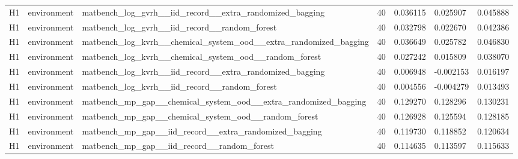 \documentclass[10pt]{article}
\begin{document}
\begin{landscape}
\begin{longtable}{L{.35in}L{.6in}L{3.55in}L{.4in}L{.88in}L{.88in}L{.88in}}
H1 & environment & matbench\_\allowbreak{}log\_\allowbreak{}gvrh\_\allowbreak{}\_\allowbreak{}iid\_\allowbreak{}record\_\allowbreak{}\_\allowbreak{}extra\_\allowbreak{}randomized\_\allowbreak{}bagging & 40 & 0.036115 & 0.025907 & 0.045888\\
H1 & environment & matbench\_\allowbreak{}log\_\allowbreak{}gvrh\_\allowbreak{}\_\allowbreak{}iid\_\allowbreak{}record\_\allowbreak{}\_\allowbreak{}random\_\allowbreak{}forest & 40 & 0.032798 & 0.022670 & 0.042386\\
H1 & environment & matbench\_\allowbreak{}log\_\allowbreak{}kvrh\_\allowbreak{}\_\allowbreak{}chemical\_\allowbreak{}system\_\allowbreak{}ood\_\allowbreak{}\_\allowbreak{}extra\_\allowbreak{}randomized\_\allowbreak{}bagging & 40 & 0.036649 & 0.025782 & 0.046830\\
H1 & environment & matbench\_\allowbreak{}log\_\allowbreak{}kvrh\_\allowbreak{}\_\allowbreak{}chemical\_\allowbreak{}system\_\allowbreak{}ood\_\allowbreak{}\_\allowbreak{}random\_\allowbreak{}forest & 40 & 0.027242 & 0.015809 & 0.038070\\
H1 & environment & matbench\_\allowbreak{}log\_\allowbreak{}kvrh\_\allowbreak{}\_\allowbreak{}iid\_\allowbreak{}record\_\allowbreak{}\_\allowbreak{}extra\_\allowbreak{}randomized\_\allowbreak{}bagging & 40 & 0.006948 & -0.002153 & 0.016197\\
H1 & environment & matbench\_\allowbreak{}log\_\allowbreak{}kvrh\_\allowbreak{}\_\allowbreak{}iid\_\allowbreak{}record\_\allowbreak{}\_\allowbreak{}random\_\allowbreak{}forest & 40 & 0.004556 & -0.004279 & 0.013493\\
H1 & environment & matbench\_\allowbreak{}mp\_\allowbreak{}gap\_\allowbreak{}\_\allowbreak{}chemical\_\allowbreak{}system\_\allowbreak{}ood\_\allowbreak{}\_\allowbreak{}extra\_\allowbreak{}randomized\_\allowbreak{}bagging & 40 & 0.129270 & 0.128296 & 0.130231\\
H1 & environment & matbench\_\allowbreak{}mp\_\allowbreak{}gap\_\allowbreak{}\_\allowbreak{}chemical\_\allowbreak{}system\_\allowbreak{}ood\_\allowbreak{}\_\allowbreak{}random\_\allowbreak{}forest & 40 & 0.126928 & 0.125594 & 0.128185\\
H1 & environment & matbench\_\allowbreak{}mp\_\allowbreak{}gap\_\allowbreak{}\_\allowbreak{}iid\_\allowbreak{}record\_\allowbreak{}\_\allowbreak{}extra\_\allowbreak{}randomized\_\allowbreak{}bagging & 40 & 0.119730 & 0.118852 & 0.120634\\
H1 & environment & matbench\_\allowbreak{}mp\_\allowbreak{}gap\_\allowbreak{}\_\allowbreak{}iid\_\allowbreak{}record\_\allowbreak{}\_\allowbreak{}random\_\allowbreak{}forest & 40 & 0.114635 & 0.113597 & 0.115633\\

\end{longtable}
\end{landscape}
\end{document}
